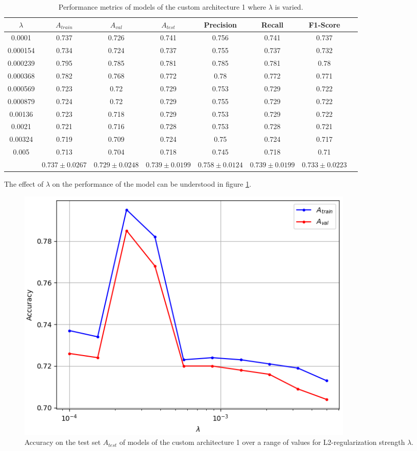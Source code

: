 \begin{table}[ht]
\centering
\begin{tabular}{ |c|c|c|c|c|c|c|c| }
\hline
$\lambda$ & $A_{train}$ & $A_{val}$ & $A_{test}$ & Precision & Recall & F1-Score \\
\hline
0.0001 & 0.737 & 0.726 & 0.741 & 0.756 & 0.741 & 0.737 \\
0.000154 & 0.734 & 0.724 & 0.737 & 0.755 & 0.737 & 0.732 \\
0.000239 & 0.795 & 0.785 & 0.781 & 0.785 & 0.781 & 0.78 \\
0.000368 & 0.782 & 0.768 & 0.772 & 0.78 & 0.772 & 0.771 \\
0.000569 & 0.723 & 0.72 & 0.729 & 0.753 & 0.729 & 0.722 \\
0.000879 & 0.724 & 0.72 & 0.729 & 0.755 & 0.729 & 0.722 \\
0.00136 & 0.723 & 0.718 & 0.729 & 0.753 & 0.729 & 0.722 \\
0.0021 & 0.721 & 0.716 & 0.728 & 0.753 & 0.728 & 0.721 \\
0.00324 & 0.719 & 0.709 & 0.724 & 0.75 & 0.724 & 0.717 \\
0.005 & 0.713 & 0.704 & 0.718 & 0.745 & 0.718 & 0.71 \\
\hline
 & $0.737\pm0.0267$ & $0.729\pm0.0248$ & $0.739\pm0.0199$ & $0.758\pm0.0124$ & $0.739\pm0.0199$ & $0.733\pm0.0223$ \\
\hline
\end{tabular}
\caption{Performance metrics of models of the custom architecture 1 where $\lambda$ is varied.}
\label{table:custom1_all}
\end{table}

The effect of $\lambda$ on the performance of the model can be understood in figure \ref{fig:custom1_lambda}.

\begin{figure}[ht]
    \centering
    \includegraphics[width=0.8\textwidth]{figs/custom1_lambda.png}
    \caption{Accuracy on the test set $A_{test}$ of models of the custom architecture 1 over a range of values for L2-regularization strength $\lambda$.}
    \label{fig:custom1_lambda}
\end{figure}

